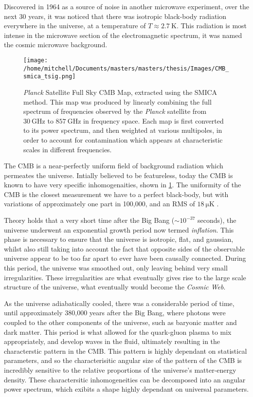 \par Discovered in 1964 \citep{Penzias:65} as a source of noise in another microwave experiment, over the next 30 years, it was noticed that there was isotropic black-body radiation everywhere in the universe, at a temperature of $T \approx \SI{2.7}{\kelvin}$. This radiation is most intense in the microwave section of the electromagnetic spectrum, it was named the cosmic microwave background.
\begin{figure}[ht]
	\centering
	\texttt{[image: /home/mitchell/Documents/masters/masters/thesis/Images/CMB\_smica\_tsig.png]}
	\label{CMB Map}
	\caption{\emph{Planck} Satellite Full Sky CMB Map, extracted using the SMICA method. This  map was produced by linearly combining the full spectrum of frequencies observed by the \emph{Planck} satellite from $\SI{30}{\giga\hertz}$ to $\SI{857}{\giga\hertz}$ in frequency space. Each map is first converted to its power spectrum, and then weighted at various multipoles, in order to account for contamination which appears at characteristic scales in different frequencies.}
\end{figure}

The CMB is a near-perfectly uniform field of background radiation which permeates the universe. Intially believed to be featureless, today the CMB is known to have very specific inhomogenaities, shown in \ref{CMB Map}. The uniformity of the CMB is the closest measurement we have to a perfect black-body, but with variations of approximately one part in 100,000, and an RMS of $\SI{18}{\micro\kelvin}$ \citep{2004mmu..symp..291W}. 

Theory holds that a very short time after the Big Bang ($\sim 10^{-37}$ seconds), the universe underwent an exponential growth period now termed \textit{inflation}. This phase is necessary to ensure that the universe is isotropic, flat, and gaussian, whilst also still taking into account the fact that opposite sides of the observable universe appear to be too far apart to ever have been causally connected. During this period, the universe was smoothed out, only leaving behind very small irregularities. These irregularities are what eventually gives rise to the large scale structure of the universe, what eventually would become the \emph{Cosmic Web}. 

As the universe adiabatically cooled, there was a considerable period of time, until approximately 380,000 years after the Big Bang, where photons were coupled to the other components of the universe, such as baryonic matter and dark matter. This period is what allowed for the quark-gluon plasma to mix appropriately, and develop waves in the fluid, ultimately resulting in the characterstic pattern in the CMB. This pattern is highly dependant on statistical parameters, and so the characterisitic angular size of the pattern of the CMB is incredibly sensitive to the relative proportions of the universe's matter-energy density. These charactersitic inhomogeneities can be decomposed into an angular power spectrum, which exibits a shape highly dependant on universal parameters. 


